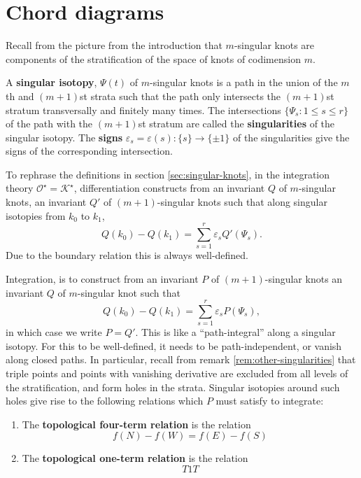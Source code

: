 \section{Chord diagrams}
\label{sec:chord-diagrams}

Recall from the picture from the introduction that \(m\)-singular knots are components of the stratification of the space of knots of codimension \(m\).

\begin{definition}
	A \textbf{singular isotopy}, \(\Psi(t)\) of \(m\)-singular knots is a path in the union of the \(m\)th and \((m + 1)\)st strata such that the path only intersects the \((m + 1)\)st stratum transversally and finitely many times. The intersections \(\{\Psi_{s} : 1 \leq s \leq r\}\) of the path with the \((m + 1)\)st stratum are called the \textbf{singularities} of the singular isotopy. The \textbf{signs} \(\varepsilon_{s} = \varepsilon(s): \{s\} \to \{\pm 1\}\) of the singularities give the signs of the corresponding intersection.
\end{definition}


To rephrase the definitions in section \ref{sec:singular-knots}, in the integration theory \(\mathcal{O}^{\star} = \mathcal{K}^{\star}\), differentiation constructs from an invariant \(Q\) of \(m\)-singular knots, an invariant \(Q'\) of \((m + 1)\)-singular knots such that along singular isotopies from \(k_{0}\) to \(k_{1}\),
\[Q(k_{0}) - Q(k_{1}) = \sum_{s = 1}^{r}\varepsilon_{s} Q'(\Psi_{s}).\]
Due to the boundary relation this is always well-defined.

Integration, is to construct from an invariant \(P\) of \((m + 1)\)-singular knots an invariant \(Q\) of \(m\)-singular knot such that
\[Q(k_{0}) - Q(k_{1}) = \sum_{s = 1}^{r}\varepsilon_{s} P(\Psi_{s}),\]
in which case we write \(P = Q'\). This is like a ``path-integral'' along a singular isotopy. For this to be well-defined, it needs to be path-independent, or vanish along closed paths. In particular, recall from remark \ref{rem:other-singularities} that triple points and points with vanishing derivative are excluded from all levels of the stratification, and form holes in the strata. Singular isotopies around such holes give rise to the following relations which \(P\) must satisfy to integrate:

\begin{definitions}
	\begin{enumerate}
		\item The \textbf{topological four-term relation} is the relation
			\[f(N) - f(W) = f(E) - f(S) \label{}\]
		\item The \textbf{topological one-term relation} is the relation
			\[T1T\]
	\end{enumerate}
\end{definitions}

